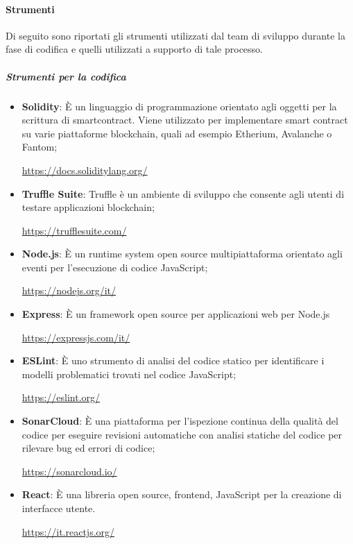         \paragraph{Strumenti}    \label{paragraph:Strumenti}
        Di seguito sono riportati gli strumenti utilizzati dal team di sviluppo durante la fase di codifica e quelli utilizzati a supporto di tale processo.
        \subparagraph{Strumenti per la codifica}
        \begin{itemize}
            \item \textbf{Solidity}: È un linguaggio di programmazione orientato agli oggetti per la scrittura di smartcontract\glo{}. Viene utilizzato per implementare smart contract\glo{} su varie piattaforme blockchain\glo{}, quali ad esempio Etherium\glo{}, Avalanche\glo{} o Fantom\glo{};
            \begin{center}\url{https://docs.soliditylang.org/}\end{center}
            \item \textbf{Truffle Suite}: 
            Truffle è un ambiente di sviluppo che consente agli utenti di testare applicazioni blockchain\glo{};
            \begin{center}\url{https://trufflesuite.com/}\end{center}
            \item \textbf{Node.js}: È un runtime system\glo{} open source\glo{} multipiattaforma orientato agli eventi per l'esecuzione di codice JavaScript\glo{};
            \begin{center}\url{https://nodejs.org/it/}\end{center}
            \item \textbf{Express}: È un framework\glo{} open source\glo{} per applicazioni web per Node.js
            \begin{center}\url{https://expressjs.com/it/}\end{center}
            \item \textbf{ESLint}: È uno strumento di analisi del codice statico per identificare i modelli problematici trovati nel codice JavaScript\glo{};
            \begin{center}\url{https://eslint.org/}\end{center}
            \item \textbf{SonarCloud}: È una piattaforma per l'ispezione continua della qualità del codice per eseguire revisioni automatiche con analisi statiche del codice per rilevare bug ed errori di codice;
            \begin{center}\url{https://sonarcloud.io/}\end{center}
            \item \textbf{React}: È una libreria open source\glo{}, frontend\glo{}, JavaScript\glo{} per la creazione di interfacce utente.
            \begin{center}\url{https://it.reactjs.org/}\end{center}
        \end{itemize}
